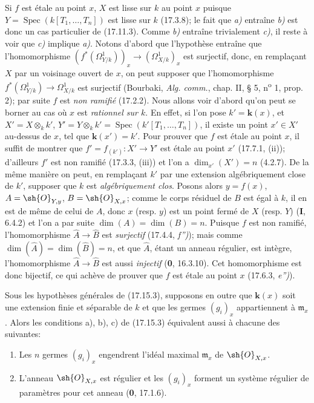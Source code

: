 Si $f$ est étale au point $x$, $X$ est lisse sur $k$ au point $x$ puisque $Y=\operatorname{Spec}(k[T_1,\ldots,T_n])$ est lisse sur $k$ (17.3.8); le fait que \emph{a)} entraîne \emph{b)} est donc un cas particulier de (17.11.3). Comme \emph{b)} entraîne trivialement \emph{c)}, il reste à voir que \emph{c)} implique \emph{a)}. Notons d'abord
que l'hypothèse entraîne que l'homomorphisme $(f^*(\varOmega^1_{Y/k}))_x\to(\varOmega^1_{X/k})_x$ est surjectif, donc, en remplaçant $X$ par un voisinage ouvert de $x$, on peut supposer que l'homomorphisme $f^*(\varOmega^1_{Y/k})\to\varOmega^1_{X/k}$ est surjectif (Bourbaki, \emph{Alg. comm.}, chap. II, § 5, n\textsuperscript{o} 1, prop. 2); par suite $f$ est \emph{non ramifié} (17.2.2). Nous allons voir d'abord qu'on peut se borner au cas où $x$ est \emph{rationnel sur $k$}. En effet, si l'on pose $k'=\boldsymbol{k}(x)$, et $X'=X\otimes_k k'$, $Y'=Y\otimes_k k'=\operatorname{Spec}(k'[T_1,\ldots,T_n])$, il existe un point $x'\in X'$ au-dessus de $x$, tel que $\boldsymbol{k}(x')=k'$. Pour prouver que $f$ est étale au point $x$, il suffit de montrer que $f'=f_{(k')}:X'\to Y'$ est étale au point $x'$ (17.7.1, (ii)); d'ailleurs $f'$ est non ramifié (17.3.3, (iii)) et l'on a $\dim_{x'}(X')=n$ (4.2.7). De la même manière on peut, en remplaçant $k'$ par une extension algébriquement close de $k'$, supposer que $k$ est \emph{algébriquement clos}. Posons alors $y=f(x)$, $A=\sh{O}_{Y,y}$, $B=\sh{O}_{X,x}$; comme le corps résiduel de $B$ est égal à $k$, il en est de même de celui de $A$, donc $x$ (resp. $y$) est un point fermé de $X$ (resp. $Y$) (\textbf{I}, 6.4.2) et l'on a par suite $\dim(A)=\dim(B)=n$. Puisque $f$ est non ramifié, l'homomorphisme $\widehat A\to\widehat B$ est \emph{surjectif} (17.4.4, \emph{f'')}); mais comme $\dim(\widehat A)=\dim(\widehat B)=n$, et que $\widehat A$, étant un anneau régulier, est intègre, l'homomorphisme $\widehat A\to\widehat B$ est aussi \emph{injectif} (\textbf{0}, 16.3.10). Cet homomorphisme est donc bijectif, ce qui achève de prouver que $f$ est étale au point $x$ (17.6.3, \emph{e'')}).

\begin{corollary}[17.15.4]
\label{IV.17.15.4}
Sous les hypothèses générales de \textup{(17.15.3)}, supposons en outre que $\boldsymbol{k}(x)$ soit une extension \textup{finie} et \textup{séparable} de $k$ et que les germes $(g_i)_x$ appartiennent à $\mathfrak m_x$. Alors les conditions \textup{a), b), c)} de \textup{(17.15.3)} équivalent aussi à chacune des suivantes:
\begin{enumerate}
  \item[\textup{d)}] Les $n$ germes $(g_i)_x$ engendrent l'idéal maximal $\mathfrak m_x$ de $\sh{O}_{X,x}$.
  \item[\textup{d$'$)}] L'anneau $\sh{O}_{X,x}$ est régulier et les $(g_i)_x$ forment un système régulier de paramètres pour cet anneau \textup{(\textbf{0}, 17.1.6)}.
\end{enumerate}
\end{corollary}

